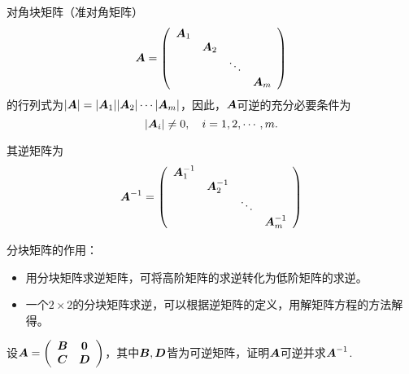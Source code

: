 \begin{frame}


  \begin{dingyi}[可逆分块矩阵的逆矩阵]
    对角块矩阵（准对角矩阵）
    $$
    \boldsymbol{A} = \left(
      \begin{array}{cccc}
        \boldsymbol{A}_1&&&\\
            &\boldsymbol{A}_2&&\\
            &&\ddots&\\
            &&&\boldsymbol{A}_m
      \end{array}
    \right)
    $$
    的行列式为$|\boldsymbol{A}|=|\boldsymbol{A}_1||\boldsymbol{A}_2|\cdots|\boldsymbol{A}_m|$，因此，$\boldsymbol{A}$可逆的充分必要条件为
    $$
    |\boldsymbol{A}_i|\ne 0, \quad i=1,2,\cdots, m.
    $$

    其逆矩阵为
    $$
    \boldsymbol{A}^{-1} = \left(
      \begin{array}{cccc}
        \boldsymbol{A}_1^{-1}&&&\\
                 &\boldsymbol{A}_2^{-1}&&\\
                 &&\ddots&\\
                 &&&\boldsymbol{A}_m^{-1}
      \end{array}
    \right)
    $$
  \end{dingyi}
\end{frame}

\begin{frame}
  分块矩阵的作用：
  \begin{itemize}
  \item   用分块矩阵求逆矩阵，可将高阶矩阵的求逆转化为低阶矩阵的求逆。
  \item   一个$2\times 2$的分块矩阵求逆，可以根据逆矩阵的定义，用解矩阵方程的方法解得。
  \end{itemize}
\end{frame}

\begin{frame}
  \begin{li}
    设$\MA=\left(
      \begin{array}{cc}
        \MB&\M0\\
        \MC&\MD
      \end{array}
    \right)$，其中$\boldsymbol{B},\boldsymbol{D}$皆为可逆矩阵，证明$\boldsymbol{A}$可逆并求$\boldsymbol{A}^{-1}$.
  \end{li}
\end{frame}

